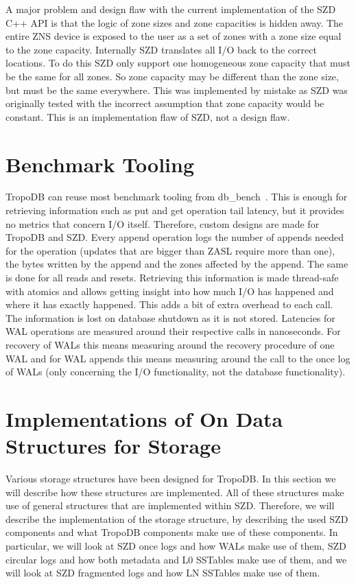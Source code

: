 A major problem and design flaw with the current implementation of the SZD C++ API is that the logic of zone sizes and zone capacities is hidden away. The entire ZNS device is exposed to the user as a set of zones with a zone size equal to the zone capacity. Internally SZD translates all I/O back to the correct locations. To do this SZD only support one homogeneous zone capacity that must be the same for all zones. So zone capacity may be different than the zone size, but must be the same everywhere. This was implemented by mistake as SZD was originally tested with the incorrect assumption that zone capacity would be constant. This is an implementation flaw of SZD, not a design flaw.  

\section{Benchmark Tooling}
\label{sec:benchtool}
TropoDB can reuse most benchmark tooling from db\_bench~\cite{cao2020characterizing}. This is enough for retrieving information such as put and get operation tail latency, but it provides no metrics that concern I/O itself. Therefore, custom designs are made for TropoDB and SZD. Every append operation logs the number of appends needed for the operation (updates that are bigger than ZASL require more than one), the bytes written by the append and the zones affected by the append. The same is done for all reads and resets. Retrieving this information is made thread-safe with atomics and allows getting insight into how much I/O has happened and where it has exactly happened. This adds a bit of extra overhead to each call. The information is lost on database shutdown as it is not stored. Latencies for WAL operations are measured around their respective calls in nanoseconds. For recovery of WALs this means measuring around the recovery procedure of one WAL and for WAL appends this means measuring around the call to the once log of WALs (only concerning the I/O functionality, not the database functionality).

\section{Implementations of On Data Structures for Storage}
Various storage structures have been designed for TropoDB. In this section we will describe how these structures are implemented. All of these structures make use of general structures that are implemented within SZD. Therefore, we will describe the implementation of the storage structure, by describing the used SZD components and what TropoDB components make use of these components. In particular, we will look at SZD once logs and how WALs make use of them, SZD circular logs and how both metadata and L0 SSTables make use of them, and we will look at SZD fragmented logs and how LN SSTables make use of them.

